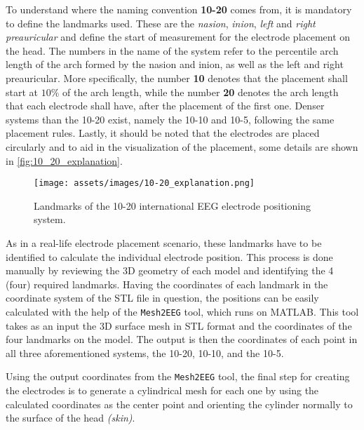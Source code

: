 To understand where the naming convention \textbf{10-20} comes from, it is mandatory to define the landmarks used. These are the \textit{\gls{nasion}}, \textit{\gls{inion}}, \textit{left} and \textit{right \gls{preauricular}} and define the start of measurement for the electrode placement on the head. The numbers in the name of the system refer to the percentile arch length of the arch formed by the \gls{nasion} and \gls{inion}, as well as the left and right \gls{preauricular}. More specifically, the number \textbf{10} denotes that the placement shall start at $10\%$ of the arch length, while the number \textbf{20} denotes the arch length that each electrode shall have, after the placement of the first one. Denser systems than the 10-20 exist, namely the 10-10 and 10-5, following the same placement rules. Lastly, it should be noted that the electrodes are placed circularly and to aid in the visualization of the placement, some details are shown in \autoref{fig:10_20_explanation}.

\begin{figure}[H]
    \centering
    \texttt{[image: assets/images/10-20\_explanation.png]}
    \caption[Landmarks of the 10-20 international \gls{EEG} electrode positioning system]{Landmarks of the 10-20 international \gls{EEG} electrode positioning system. \cite[figure 13.2, p.368]{Malmivuo1995}}
    \label{fig:10_20_explanation}
\end{figure}

As in a real-life electrode placement scenario, these landmarks have to be identified to calculate the individual electrode position. This process is done manually by reviewing the 3D geometry of each model and identifying the 4 (four) required landmarks. Having the coordinates of each landmark in the coordinate system of the \gls{STL} file in question, the positions can be easily calculated with the help of the \texttt{Mesh2EEG} \cite{Giacometti2014} tool, which runs on \gls{MATLAB}. This tool takes as an input the 3D surface mesh in \gls{STL} format and the coordinates of the four landmarks on the model. The output is then the coordinates of each point in all three aforementioned systems, the 10-20, 10-10, and the 10-5.

Using the output coordinates from the \texttt{Mesh2EEG} \cite{Giacometti2014} tool, the final step for creating the electrodes is to generate a cylindrical mesh for each one by using the calculated coordinates as the center point and orienting the cylinder normally to the surface of the head \textit{(skin)}.
\\\vspace{1pt}

